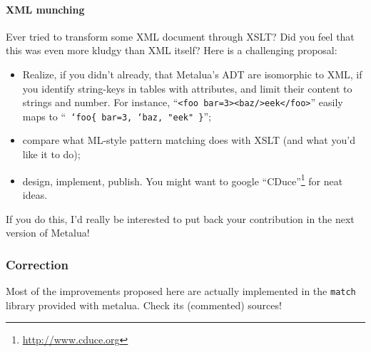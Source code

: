 \paragraph{XML munching} Ever tried to transform some XML document through
XSLT? Did you feel that this was even more kludgy than XML itself? Here
is a challenging proposal:
\begin{itemize}
\item Realize, if you didn't already, that Metalua's ADT are
  isomorphic to XML, if you identify string-keys in tables with
  attributes, and limit their content to strings and number. For
  instance, ``{\tt <foo bar=3><baz/>eek</foo>}'' easily maps to ``{\tt
    `foo\{ bar=3, `baz, "eek" \}}'';
\item compare what ML-style pattern matching does with XSLT
  (and what you'd like it to do);
\item design, implement, publish. You might want to google
  ``CDuce''\footnote{\url{http://www.cduce.org}} for neat ideas.
\end{itemize}

If you do this, I'd really be interested to put back your contribution
in the next version of Metalua!

\subsubsection{Correction}
Most of the improvements proposed here are actually implemented in the
{\tt match} library provided with metalua. Check its (commented)
sources!
